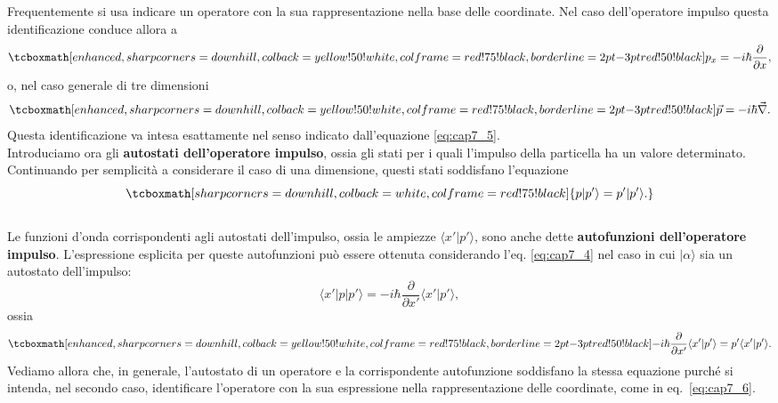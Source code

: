 \documentclass[a4paper,12pt,oneside]{book}
\begin{document}
Frequentemente si usa indicare un operatore con la sua rappresentazione nella base delle coordinate. Nel caso dell'operatore impulso questa identificazione conduce allora a
	\begin{equation}
		\label{eq:cap7_6}
		\tcboxmath[enhanced,sharp corners=downhill ,colback=yellow!50!white,colframe=red!75!black, borderline={2pt}{-3pt}{red!50!black}]{
			p_x= -i\hbar \frac{\partial}{\partial x} ,
			}
	\end{equation}
o, nel caso generale di tre dimensioni
	\begin{equation}
		\tcboxmath[enhanced,sharp corners=downhill ,colback=yellow!50!white,colframe=red!75!black, borderline={2pt}{-3pt}{red!50!black}]{
			\vec{p}= -i\hbar \vec{\nabla}.
			}
	\end{equation}
Questa identificazione va intesa esattamente nel senso indicato dall'equazione \eqref{eq:cap7_5}.\\

Introduciamo ora gli \textbf{autostati dell'operatore impulso}, ossia gli stati per i quali l'impulso della particella ha un valore determinato. Continuando per semplicità a considerare il caso di una dimensione, questi stati soddisfano l'equazione
	\begin{equation}
		\tcboxmath[sharp corners=downhill ,colback=white,colframe=red!75!black]{
			p | p' \rangle = p' | p' \rangle.
			}
	\end{equation}\\
	
Le funzioni d'onda corrispondenti agli autostati dell'impulso, ossia le ampiezze $\langle x' | p' \rangle$, sono anche dette \textbf{autofunzioni dell'operatore impulso}. L'espressione esplicita per queste autofunzioni può essere ottenuta considerando l'eq. \eqref{eq:cap7_4} nel caso in cui $| \alpha \rangle$ sia un autostato dell'impulso:
	\begin{equation}
		\langle x' | p | p' \rangle = -i \hbar \frac{\partial}{\partial x'} \langle x' | p' \rangle,
	\end{equation}
\noindent ossia
	\begin{equation}
		\label{eq:cap7_7}
		\tcboxmath[enhanced,sharp corners=downhill ,colback=yellow!50!white,colframe=red!75!black, borderline={2pt}{-3pt}{red!50!black}]{
			-i \hbar \frac{\partial}{\partial x'} \langle x' | p' \rangle = p' \langle x' | p' \rangle.
			}
	\end{equation}
Vediamo allora che, in generale, l'autostato di un operatore e la corrispondente autofunzione soddisfano la stessa equazione purché si intenda, nel secondo caso, identificare l'operatore con la sua espressione nella rappresentazione delle coordinate, come in eq.~\eqref{eq:cap7_6}.\\
\end{document}
